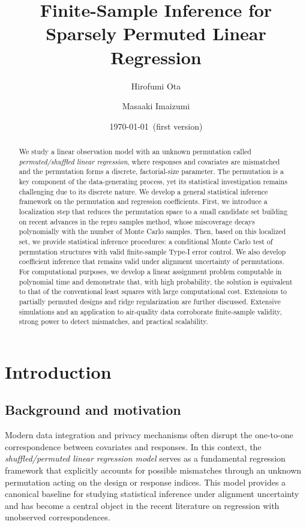 \documentclass[11pt, reqno]{amsart}
\title{Finite-Sample Inference for Sparsely Permuted Linear Regression}
\author[H. Ota]{Hirofumi Ota}
\author[M. Imaizumi]{Masaaki Imaizumi}
\date{\today\  (first version)}
\newcommand{\1}{\mbox{1}\hspace{-0.25em}\mbox{l}}
\theoremstyle{definition}\newtheorem{problem}{Problem}[section]
\theoremstyle{definition}\newtheorem{definition}[problem]{Definition}
\theoremstyle{remark}\newtheorem{assumption}{Assumption}
\theoremstyle{remark}\newtheorem{remark}[problem]{Remark}
\theoremstyle{definition}\newtheorem{example}[problem]{Example}
\theoremstyle{plain}\newtheorem{theorem}[problem]{Theorem}
\theoremstyle{plain}\newtheorem{question}[problem]{Question}
\theoremstyle{plain}\newtheorem{lemma}[problem]{Lemma}
\theoremstyle{plain}\newtheorem{proposition}[problem]{Proposition}
\theoremstyle{plain}\newtheorem{corollary}[problem]{Corollary}
\theoremstyle{plain}\newtheorem{conjecture}[problem]{Conjecture}
\begin{document}
\maketitle
\begin{abstract}
We study a linear observation model with an unknown permutation called \textit{permuted/shuffled linear regression}, where responses and covariates are mismatched and the permutation forms a discrete, factorial-size parameter. 
The permutation is a key component of the data-generating process, yet its statistical investigation remains challenging due to its discrete nature.
We develop a general statistical inference framework on the permutation and regression coefficients. First, we introduce a localization step that reduces the permutation space to a small candidate set building on recent advances in the repro samples method, whose miscoverage decays polynomially with the number of Monte Carlo samples. Then, based on this localized set, we provide statistical inference procedures: a conditional Monte Carlo test of permutation structures with valid finite-sample Type-I error control. We also develop coefficient inference that remains valid under alignment uncertainty of permutations. For computational purposes, we develop a linear assignment problem computable in polynomial time and demonstrate that, with high probability, the solution is equivalent to that of the conventional least squares with large computational cost. Extensions to partially permuted designs and ridge regularization are further discussed. Extensive simulations and an application to air-quality data corroborate finite-sample validity, strong power to detect mismatches, and practical scalability.
\end{abstract}




\section{Introduction}

\subsection{Background and motivation}

Modern data integration and privacy mechanisms often disrupt the one-to-one correspondence between covariates and responses.  
In this context, the \emph{shuffled/permuted linear regression model} \citep{abid2017linear, pananjady2017linear} serves as a fundamental regression framework that explicitly accounts for possible mismatches through an unknown permutation acting on the design or response indices.  
This model provides a canonical baseline for studying statistical inference under alignment uncertainty and has become a central object in the recent literature on regression with unobserved correspondences.
\end{document}
